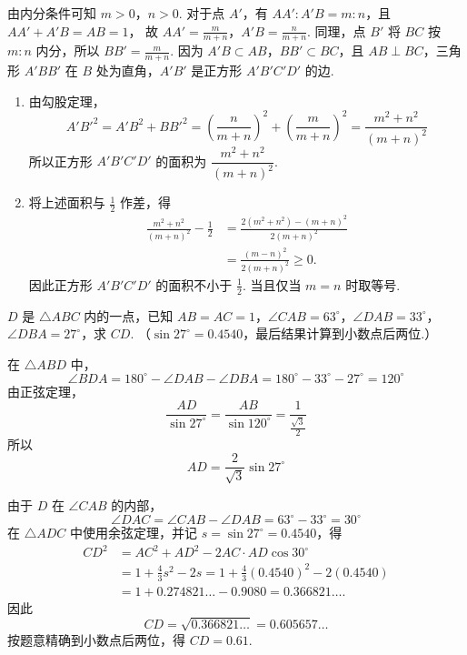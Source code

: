 \documentclass[UTF8,a4paper,oneside,11pt]{ctexbook}
\begin{document}
\begin{solution}
由内分条件可知 \(m>0\)，\(n>0\). 对于点 \(A'\)，有
\(AA':A'B=m:n\)，且 \(AA'+A'B=AB=1\)，
故 \(AA'=\frac{m}{m+n}\)，\(A'B=\frac{n}{m+n}\).
同理，点 \(B'\) 将 \(BC\) 按 \(m:n\) 内分，所以 \(BB'=\frac{m}{m+n}\). 因为 \(A'B\subset AB\)，\(BB'\subset BC\)，且 \(AB\perp BC\)，三角形 \(A'BB'\) 在 \(B\) 处为直角，\(A'B'\) 是正方形 \(A'B'C'D'\) 的边.

\begin{enumerate}
\item 由勾股定理，
\[
A'B'^2=A'B^2+BB'^2
=\left(\frac{n}{m+n}\right)^2+\left(\frac{m}{m+n}\right)^2
=\frac{m^2+n^2}{\left(m+n\right)^2}
\]
所以正方形 \(A'B'C'D'\) 的面积为 \(\dfrac{m^2+n^2}{\left(m+n\right)^2}\).

\item 将上述面积与 \(\frac12\) 作差，得
\[
\begin{aligned}
\frac{m^2+n^2}{\left(m+n\right)^2}-\frac12
&=\frac{2\left(m^2+n^2\right)-\left(m+n\right)^2}{2\left(m+n\right)^2}\\
&=\frac{\left(m-n\right)^2}{2\left(m+n\right)^2}\geq0.
\end{aligned}
\]
因此正方形 \(A'B'C'D'\) 的面积不小于 \(\frac12\). 当且仅当 \(m=n\) 时取等号.
\end{enumerate}
\end{solution}

\begin{problem}
\(D\) 是 \(\triangle ABC\) 内的一点，已知 \(AB=AC=1\)，\(\angle CAB=63^\circ\)，\(\angle DAB=33^\circ\)，\(\angle DBA=27^\circ\)，求 \(CD\). （\(\sin27^\circ=0.4540\)，最后结果计算到小数点后两位.）
\end{problem}

\begin{solution}
在 \(\triangle ABD\) 中，
\[
\angle BDA=180^\circ-\angle DAB-\angle DBA=180^\circ-33^\circ-27^\circ=120^\circ
\]
由正弦定理，
\[
\frac{AD}{\sin27^\circ}=\frac{AB}{\sin120^\circ}=\frac{1}{\frac{\sqrt3}{2}}
\]
所以
\[
AD=\frac{2}{\sqrt3}\sin27^\circ
\]


由于 \(D\) 在 \(\angle CAB\) 的内部，
\[
\angle DAC=\angle CAB-\angle DAB=63^\circ-33^\circ=30^\circ
\]
在 \(\triangle ADC\) 中使用余弦定理，并记 \(s=\sin27^\circ=0.4540\)，得
\[
\begin{aligned}
CD^2
&=AC^2+AD^2-2AC\cdot AD\cos30^\circ\\
&=1+\frac43s^2-2s=1+\frac43(0.4540)^2-2(0.4540)\\
&=1+0.274821\ldots-0.9080=0.366821\ldots.
\end{aligned}
\]
因此
\[
CD=\sqrt{0.366821\ldots}=0.605657\ldots
\]
按题意精确到小数点后两位，得 \(CD=0.61\).
\end{solution}
\end{document}
